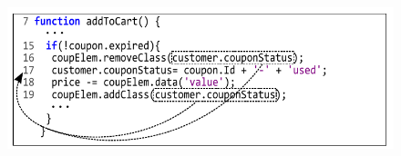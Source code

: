 \begin{figure}[!t]
  \centering
  \includegraphics[width=1\hsize]{fig/candidateDOMToCode}
  \vspace{-0.3in} 
  \label{Fig:candidateDOMToCode}
  \vspace{-0.28in} 
\end{figure}

